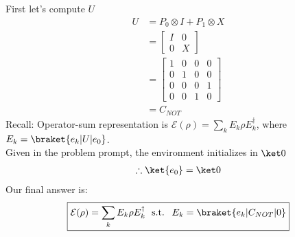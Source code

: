 First let's compute $U$
\begin{align*}
    U & = P_0 \otimes I + P_1 \otimes X\\
    & = \begin{bmatrix} I & 0 \\ 0 & X \end{bmatrix}\\
    & = \begin{bmatrix} 1 &0 & 0 & 0\\
    0 & 1 & 0 & 0\\
    0 & 0 & 0 & 1\\
    0 & 0 & 1 & 0
    \end{bmatrix}\\
    & = C_{NOT}
\end{align*}
Recall: Operator-sum representation is $\mathcal E(\rho) = \sum_k E_k \rho E_k^\dagger$, where $E_k = \braket{e_k | U | e_0}$.\\
Given in the problem prompt, the environment initializes in $\ket 0$
\begin{align*}
    \therefore \ket{e_0} = \ket 0
\end{align*}
Our final answer is:
\begin{align*}
    \boxed{\mathcal E(\rho) = \sum_k E_k \rho E_k^\dagger \  \text{ s.t. } \ E_k = \braket{e_k | C_{NOT} | 0}}
\end{align*}
